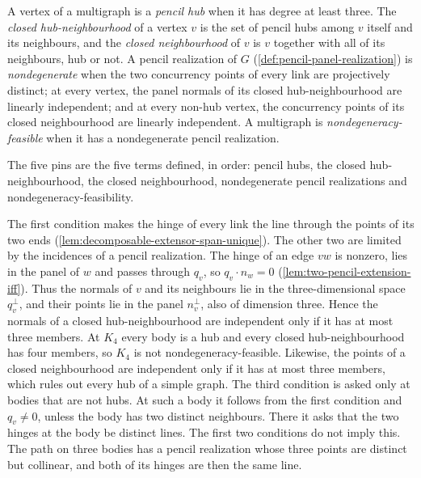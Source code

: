 \begin{definition}
  \label{def:pencil-nondegenerate}
  \leanok
  A vertex of a multigraph is a \emph{pencil hub} when it has degree at
  least three. The \emph{closed hub-neighbourhood} of a vertex $v$ is the
  set of pencil hubs among $v$ itself and its neighbours, and the
  \emph{closed neighbourhood} of $v$ is $v$ together with all of its
  neighbours, hub or not. A pencil realization of $G$
  (\cref{def:pencil-panel-realization}) is \emph{nondegenerate} when the
  two concurrency points of every link are projectively distinct; at every
  vertex, the panel normals of its closed hub-neighbourhood are linearly
  independent; and at every non-hub vertex, the concurrency points of its
  closed neighbourhood are linearly independent. A multigraph is
  \emph{nondegeneracy-feasible} when it has a nondegenerate pencil
  realization.
\end{definition}

\begin{fmlnote}
  The five pins are the five terms defined, in order: pencil hubs, the
  closed hub-neighbourhood, the closed neighbourhood, nondegenerate
  pencil realizations and nondegeneracy-feasibility.
\end{fmlnote}

The first condition makes the hinge of every link the line through the
points of its two ends (\cref{lem:decomposable-extensor-span-unique}). The
other two are limited by the incidences of a pencil realization. The hinge
of an edge $vw$ is nonzero, lies in the panel of $w$ and passes through
$q_v$, so $q_v \cdot n_w = 0$ (\cref{lem:two-pencil-extension-iff}).
Thus the normals of $v$ and its neighbours lie in the three-dimensional
space $q_v^{\perp}$, and their points lie in the panel $n_v^{\perp}$,
also of dimension three. Hence the normals of a closed
hub-neighbourhood are independent only if it has at most three members. At $K_4$ every body is
a hub and every closed hub-neighbourhood has four members, so $K_4$ is not
nondegeneracy-feasible. Likewise, the points of a closed neighbourhood are
independent only if it has at most three members, which rules out every
hub of a simple graph. The third condition is asked only at bodies that
are not hubs. At such a body it follows from the first condition and
$q_v \neq 0$, unless the body has two distinct neighbours. There it asks
that the two hinges at the body be distinct lines. The first two
conditions do not imply this. The path on three bodies has a pencil
realization whose three points are distinct but collinear, and both of its
hinges are then the same line.

